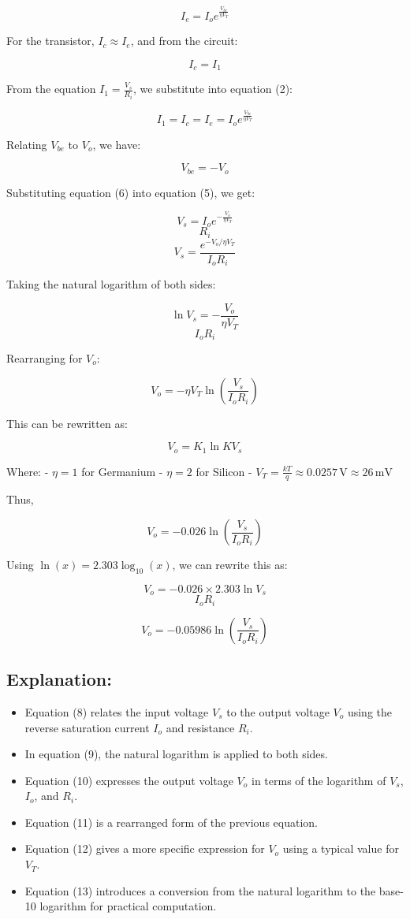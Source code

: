 \documentclass[a4paper,9pt,twoside,openany,twocolumn]{memoir}
\begin{document}
\[
I_e = I_o e^{\frac{V_{be}}{\eta V_T}} \tag{2}
\]

For the transistor, \( I_c \approx I_e \), and from the circuit:

\[
I_c = I_1 \tag{3}
\]

From the equation \( I_1 = \frac{V_s}{R_i} \), we substitute into equation (2):

\[
I_1 = I_c = I_e = I_o e^{\frac{V_{be}}{\eta V_T}} \tag{5}
\]

Relating \( V_{be} \) to \( V_o \), we have:

\[
V_{be} = -V_o \tag{6}
\]

Substituting equation (6) into equation (5), we get:

\[
V_s = I_o e^{-\frac{V_o}{\eta V_T}} \tag{7}
\]
\[
R_i
\]
\[
V_s = \frac{e^{-V_o / \eta V_T}}{I_o R_i} \tag{8}
\]

Taking the natural logarithm of both sides:

\[
\ln V_s = -\frac{V_o}{\eta V_T} \tag{9}
\]
\[
I_o R_i
\]

Rearranging for \( V_o \):

\[
V_o = -\eta V_T \ln \left( \frac{V_s}{I_o R_i} \right) \tag{10}
\]

This can be rewritten as:

\[
V_o = K_1 \ln K V_s \tag{11}
\]

Where:
- \( \eta = 1 \) for Germanium
- \( \eta = 2 \) for Silicon
- \( V_T = \frac{kT}{q} \approx 0.0257 \, \text{V} \approx 26 \, \text{mV} \)

Thus,

\[
V_o = -0.026 \ln \left( \frac{V_s}{I_o R_i} \right) \tag{12}
\]

Using \( \ln(x) = 2.303 \log_{10}(x) \), we can rewrite this as:

\[
V_o = -0.026 \times 2.303 \ln V_s \tag{13}
\]
\[
I_o R_i
\]

\[
V_o = -0.05986 \ln \left( \frac{V_s}{I_o R_i} \right) \tag{13}
\]


\subsection*{Explanation:}

\begin{itemize}
    \item Equation (8) relates the input voltage \( V_s \) to the output voltage \( V_o \) using the reverse saturation current \( I_o \) and resistance \( R_i \).
    \item In equation (9), the natural logarithm is applied to both sides.
    \item Equation (10) expresses the output voltage \( V_o \) in terms of the logarithm of \( V_s \), \( I_o \), and \( R_i \).
    \item Equation (11) is a rearranged form of the previous equation.
    \item Equation (12) gives a more specific expression for \( V_o \) using a typical value for \( V_T \).
    \item Equation (13) introduces a conversion from the natural logarithm to the base-10 logarithm for practical computation.
\end{itemize}
\end{document}
